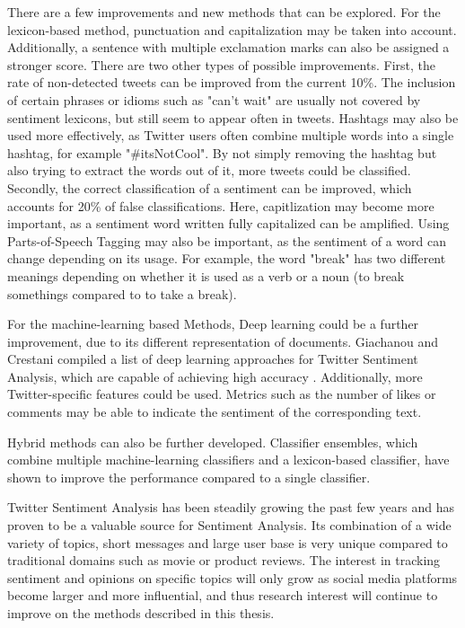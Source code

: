 There are a few improvements and new methods that can be explored. For the lexicon-based method, punctuation and capitalization may be taken into account. Additionally, a sentence with multiple exclamation marks can also be assigned a stronger score. There are two other types of possible improvements. First, the rate of non-detected tweets can be improved from the current 10\%. The inclusion of certain phrases or idioms such as "can't wait" are usually not covered by sentiment lexicons, but still seem to appear often in tweets. Hashtags may also be used more effectively, as Twitter users often combine multiple words into a single hashtag, for example "\#itsNotCool". By not simply removing the hashtag but also trying to extract the words out of it, more tweets could be classified. Secondly, the correct classification of a sentiment can be improved, which accounts for 20\% of false classifications. Here, capitlization may become more important, as a sentiment word written fully capitalized can be amplified. Using Parts-of-Speech Tagging may also be important, as the sentiment of a word can change depending on its usage. For example, the word "break" has two different meanings depending on whether it is used as a verb or a noun (to break somethings compared to to take a break).

For the machine-learning based Methods, Deep learning could be a further improvement, due to its different representation of documents. Giachanou and Crestani compiled a list of deep learning approaches for Twitter Sentiment Analysis, which are capable of achieving high accuracy \cite{DBLP:journals/csur/GiachanouC16}. Additionally, more Twitter-specific features could be used. Metrics such as the number of likes or comments may be able to indicate the sentiment of the corresponding text.

Hybrid methods can also be further developed. Classifier ensembles, which combine multiple machine-learning classifiers and a lexicon-based classifier, have shown to improve the performance compared to a single classifier.

Twitter Sentiment Analysis has been steadily growing the past few years and has proven to be a valuable source for Sentiment Analysis. Its combination of a wide variety of topics, short messages and large user base is very unique compared to traditional domains such as movie or product reviews. The interest in tracking sentiment and opinions on specific topics will only grow as social media platforms become larger and more influential, and thus research interest will continue to improve on the methods described in this thesis.

